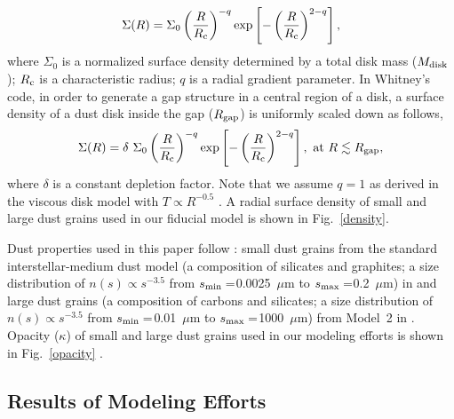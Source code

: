 \documentclass[apj]{emulateapj-rtx4}
\begin{document}
  \begin{eqnarray}
     \Sigma(R) = \Sigma_{0} \left(\frac{R}{R_{\rm c}}\right)^{-q}{\rm exp}\left[-\left(\frac{R}{R_{\rm c}}\right)^{2-q}\right],
     \label{eq_sig}
  \end{eqnarray}
  where $\Sigma_{0}$ is a normalized surface density determined by a total disk mass ($M_{\rm disk}$); $R_{\rm c}$ is a characteristic radius;
  $q$ is a radial gradient parameter. In Whitney's code, in order to generate a gap structure in a central region of a disk,
  a surface density of a dust disk inside the gap ($R_{\rm gap}$) is uniformly scaled down as follows,
  \begin{eqnarray}
     \Sigma(R) = \delta \ \Sigma_{0} \left(\frac{R}{R_{\rm c}}\right)^{-q}{\rm exp}\left[-\left(\frac{R}{R_{\rm c}}\right)^{2-q}\right],
     \ {\rm at} \ R \lesssim R_{\rm gap},
     \label{eq_sig_d}
  \end{eqnarray}
  where $\delta$ is a constant depletion factor. Note that we assume $q=1$ as derived in the viscous disk model with 
  $T \propto R^{-0.5}$ \citep{hart98}. A radial surface density of small and large dust grains used in our fiducial model
  is shown in Fig.~\ref{density}. 

  Dust properties used in this paper follow \citet{dong12b}:
  small dust grains from the standard interstellar-medium dust model (a composition of silicates and graphites; a size distribution of 
  $n(s) \propto s^{-3.5}$ from $s_{\rm min} =$0.0025~$\mu$m to $s_{\rm max} =$0.2~$\mu$m) in \citet{kim94} and large dust grains 
  (a composition of carbons and silicates; a size distribution of $n(s) \propto s^{-3.5}$ from $s_{\rm min} =$0.01~$\mu$m 
  to $s_{\rm max} =$1000~$\mu$m) from Model~2 in \citet{wood02}. Opacity ($\kappa$) of small and large dust grains used in
  our modeling efforts is shown in Fig.~\ref{opacity} \citep[see also Fig.~1 in][]{dong12b}.

  \subsection{Results of Modeling Efforts}\label{sec:result}
  
\end{document}
